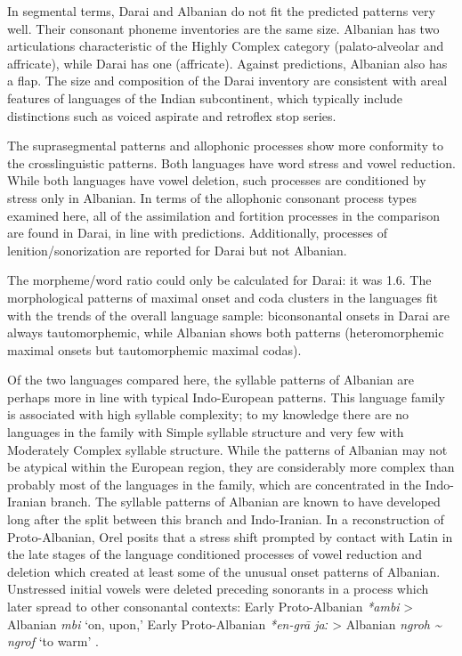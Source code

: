   In segmental terms, Darai and Albanian do not fit the predicted patterns very well. Their consonant phoneme inventories are the same size. Albanian has two articulations characteristic of the Highly Complex category (palato-alveolar and affricate), while Darai has one (affricate). Against predictions, Albanian also has a flap. The size and composition of the Darai inventory are consistent with areal features of languages of the Indian subcontinent, which typically include distinctions such as voiced aspirate and retroflex stop series.

  The suprasegmental patterns and allophonic processes show more conformity to the crosslinguistic patterns. Both languages have word stress and vowel reduction. While both languages have vowel deletion, such processes are conditioned by stress only in Albanian. In terms of the allophonic consonant process types examined here, all of the assimilation and fortition processes in the comparison are found in Darai, in line with predictions. Additionally, processes of lenition/sonorization are reported for Darai but not Albanian.

  The morpheme/word ratio could only be calculated for Darai: it was 1.6. The morphological patterns of maximal onset and coda clusters in the languages fit with the trends of the overall language sample: biconsonantal onsets in Darai are always tautomorphemic, while Albanian shows both patterns (heteromorphemic maximal onsets but tautomorphemic maximal codas).

  Of the two languages compared here, the syllable patterns of Albanian are perhaps more in line with typical Indo-European patterns. This language family is associated with high syllable complexity; to my knowledge there are no languages in the family with Simple syllable structure and very few with Moderately Complex syllable structure. While the patterns of Albanian may not be atypical within the European region, they are considerably more complex than probably most of the languages in the family, which are concentrated in the Indo-Iranian branch. The syllable patterns of Albanian are known to have developed long after the split between this branch and Indo-Iranian. In a reconstruction of Proto-Albanian, Orel posits that a stress shift prompted by contact with Latin in the late stages of the language conditioned processes of vowel reduction and deletion which created at least some of the unusual onset patterns of Albanian. Unstressed initial vowels were deleted preceding sonorants in a process which later spread to other consonantal contexts: Early Proto-Albanian \textit{*ambi} > Albanian \textit{mbi} ‘on, upon,’ Early Proto-Albanian \textit{*en-gra\={} jaː} > Albanian \textit{ngroh {\textasciitilde} ngrof} ‘to warm’ \citep[22]{Orel2000}.

